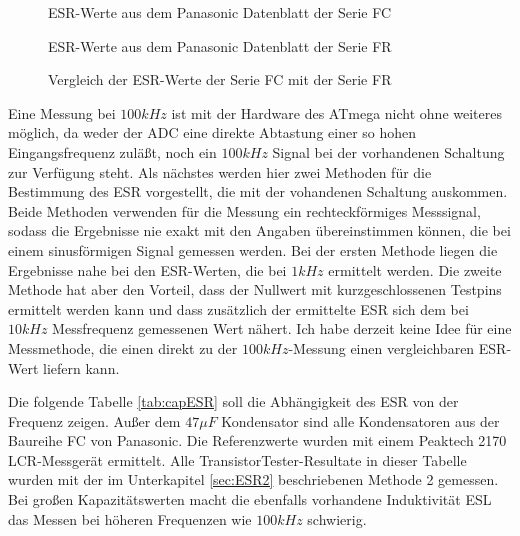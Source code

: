 \begin{figure}[H]
  \centering
    \resizebox{14cm}{!}{}
  \caption{ESR-Werte aus dem Panasonic Datenblatt der Serie FC}
  \label{fig:Cap_FC_data}
\end{figure}

\begin{figure}[H]
  \centering
    \resizebox{14cm}{!}{}
  \caption{ESR-Werte aus dem Panasonic Datenblatt der Serie FR}
  \label{fig:Cap_FR_data}
\end{figure}

\begin{figure}[H]
  \centering
    \resizebox{14cm}{!}{}
  \caption{Vergleich der ESR-Werte der Serie FC mit der Serie FR}
  \label{fig:Cap_FC_FR_data}
\end{figure}

Eine Messung bei \(100kHz\) ist mit der Hardware des ATmega nicht ohne weiteres möglich, da weder der ADC
eine direkte Abtastung einer so hohen Eingangsfrequenz zuläßt, noch ein \(100kHz\) Signal bei der vorhandenen Schaltung zur
Verfügung steht. 
Als nächstes werden hier zwei Methoden für die Bestimmung des ESR vorgestellt, die mit der vohandenen
Schaltung auskommen. 
Beide Methoden verwenden für die Messung ein rechteckförmiges Messsignal, sodass die Ergebnisse nie
exakt mit den Angaben übereinstimmen können, die bei einem sinusförmigen Signal gemessen werden.
Bei der ersten Methode liegen die Ergebnisse nahe bei den ESR-Werten, die bei \(1kHz\) ermittelt werden.
Die zweite Methode hat aber den Vorteil, dass der Nullwert mit kurzgeschlossenen Testpins ermittelt werden kann
und dass zusätzlich der ermittelte ESR sich dem bei \(10kHz\) Messfrequenz gemessenen Wert nähert.
Ich habe derzeit keine Idee für eine Messmethode, die einen direkt zu der \(100kHz\)-Messung einen 
vergleichbaren ESR-Wert liefern kann.

Die folgende Tabelle \ref{tab:capESR} soll die Abhängigkeit des ESR von der Frequenz zeigen.
Außer dem \(47\mu F\) Kondensator sind alle Kondensatoren aus der Baureihe FC von Panasonic.
Die Referenzwerte wurden mit einem Peaktech 2170 LCR-Messgerät ermittelt.
Alle TransistorTester-Resultate in dieser Tabelle wurden mit der im Unterkapitel \ref{sec:ESR2} 
beschriebenen Methode 2 gemessen.
Bei großen Kapazitätswerten macht die ebenfalls vorhandene Induktivität ESL das Messen bei höheren Frequenzen 
wie \(100kHz\) schwierig.


